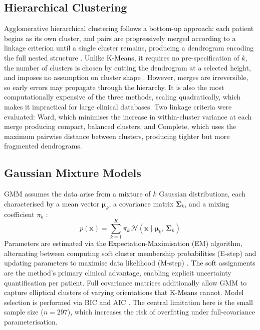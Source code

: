 \documentclass[twocolumn, fontsize=10pt]{article}
\begin{document}
\subsection{Hierarchical Clustering}
Agglomerative hierarchical clustering follows a bottom-up approach: each 
patient begins as its own cluster, and pairs are progressively merged 
according to a linkage criterion until a single cluster remains, producing 
a dendrogram encoding the full nested structure \citep{jain1999data}. 
Unlike K-Means, it requires no pre-specification of $k$, the number of 
clusters is chosen by cutting the dendrogram at a selected 
height, and imposes no assumption on cluster shape \citep{bishop2006pattern}. 
However, merges are irreversible, so early errors may propagate through 
the hierarchy. It is also the most computationally expensive of the three 
methods, scaling quadratically, which makes it impractical for large clinical databases. Two linkage criteria were evaluated:  {Ward}, which minimises the increase in within-cluster variance at each merge producing compact, balanced clusters, and  {Complete}, which uses the maximum pairwise distance between 
clusters, producing tighter but more fragmented dendrograms.

\subsection{Gaussian Mixture Models}
GMM assumes the data arise from a mixture of $k$ Gaussian distributions, 
each characterised by a mean vector $\boldsymbol{\mu}_k$, a covariance 
matrix $\boldsymbol{\Sigma}_k$, and a mixing coefficient $\pi_k$ 
\citep{reynolds2009gaussian}:
%
\begin{equation}
    p(\mathbf{x}) = \sum_{k=1}^{K} \pi_k \,\mathcal{N}(\mathbf{x} \mid 
    \boldsymbol{\mu}_k,\, \boldsymbol{\Sigma}_k)
\end{equation}
%
Parameters are estimated via the Expectation-Maximisation (EM) algorithm, 
alternating between computing soft cluster membership probabilities 
(E-step) and updating parameters to maximise data likelihood (M-step) 
\citep{bishop2006pattern}. The soft assignments are the method's primary 
clinical advantage, enabling explicit uncertainty quantification per 
patient. Full covariance matrices additionally allow GMM to capture 
elliptical clusters of varying orientations that K-Means cannot. Model 
selection is performed via BIC and AIC \citep{hastie2009elements}. The 
central limitation here is the small sample size ($n = 297$), which 
increases the risk of overfitting under full-covariance parameterisation.
\end{document}

